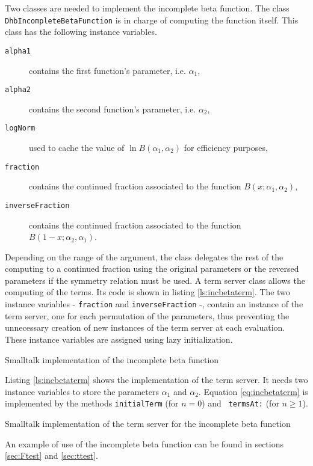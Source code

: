 \documentclass[twoside]{book}
\begin{document}
Two classes are needed to implement the incomplete beta function.
The class {\tt DhbIncompleteBetaFunction} is in charge of
computing the function itself. This class has the following
instance variables.
\begin{description}
\item[\tt alpha1]contains the first function's parameter, i.e.
$\alpha_1$,
\item[\tt alpha2]contains the second function's parameter, i.e.
$\alpha_2$,
\item[\tt logNorm]used to cache the value of $\ln B\left(\alpha_1,\alpha_2\right)$ for efficiency
purposes,
\item[\tt fraction]contains the continued fraction associated to the
function $B\left(x;\alpha_1,\alpha_2\right)$,
\item[\tt inverseFraction]contains the continued fraction associated to the
function $B\left(1-x;\alpha_2,\alpha_1\right)$.
\end{description}
Depending on the range of the argument, the class delegates the
rest of the computing to a continued fraction using the original
parameters or the reversed parameters if the symmetry relation
must be used. A term server class allows the computing of the
terms. Its code is shown in listing \ref{ls:incbetaterm}. The two
instance variables - {\tt fraction} and {\tt inverseFraction} -,
contain an instance of the term server, one for each permutation
of the parameters, thus preventing the unnecessary creation of new
instances of the term server at each evaluation. These instance
variables are assigned using lazy initialization.
\begin{listing} Smalltalk implementation of the incomplete beta function
\label{ls:incbeta}

\end{listing}
Listing \ref{ls:incbetaterm} shows the implementation of the term
server. It needs two instance variables to store the parameters
$\alpha_1$ and $\alpha_2$. Equation \ref{eq:incbetaterm} is
implemented by the methods {\tt initialTerm} (for $n=0$) and {\tt
termsAt:} (for $n\ge 1$).
\begin{listing} Smalltalk implementation of the term server for the incomplete beta function
\label{ls:incbetaterm}

\end{listing}
An example of use of the incomplete beta function can be found in
sections \ref{sec:Ftest} and \ref{sec:ttest}.
\end{document}
